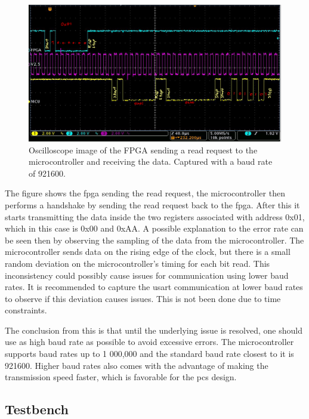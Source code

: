 \documentclass[main.tex]{subfiles}
\begin{document}
\begin{figure}[!ht]
    \centering
    \includegraphics[width=18cm]{images/USARTTransaction.png}
    \caption{Oscilloscope image of the FPGA sending a read request to the microcontroller and receiving the data. Captured with a baud rate of 921600.}
    \label{fig: usart_com}
\end{figure}
\FloatBarrier

The figure shows the \gls{fpga} sending the read request, the microcontroller then performs a handshake by sending the read request back to the \gls{fpga}. After this it starts transmitting the data inside the two registers associated with address 0x01, which in this case is 0x00 and 0xAA. A possible explanation to the error rate can be seen then by observing the sampling of the data from the microcontroller. The microcontroller sends data on the rising edge of the clock, but there is a small random deviation on the microcontroller's timing for each bit read. This inconsistency could possibly cause issues for communication using lower baud rates. It is recommended to capture the \gls{usart} communication at lower baud rates to observe if this deviation causes issues. This is not been done due to time constraints.

The conclusion from this is that until the underlying issue is resolved, one should use as high baud rate as possible to avoid excessive errors. The microcontroller supports baud rates up to 1 000,000 and the standard baud rate closest to it is 921600. Higher baud rates also comes with the advantage of making the transmission speed faster, which is favorable for the \gls{pcs} design.

\subsection{Testbench}
\end{document}
